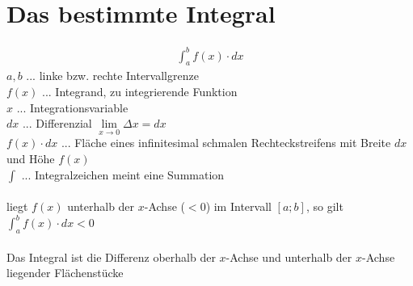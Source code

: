 \section{Das bestimmte Integral}
\begin{gather*}
  \int_a^b f(x) \cdot dx
\end{gather*}
$a, b$ ... linke bzw. rechte Intervallgrenze \\
$f(x)$ ... Integrand, zu integrierende Funktion \\
$x$ ... Integrationsvariable \\
$dx$ ... Differenzial \gap $\lim\limits_{x \to 0} \Delta x = dx$ \\
$f(x) \cdot dx$ ... Fläche eines infinitesimal schmalen Rechteckstreifens mit Breite $dx$ und Höhe $f(x)$ \\
$\int$ ... Integralzeichen meint eine Summation \\\\
liegt $f(x)$ unterhalb der $x$-Achse ($<0$) im Intervall $\left[a; b\right]$, so gilt $\int_a^b f(x) \cdot dx < 0$ \\\\
Das Integral ist die Differenz oberhalb der $x$-Achse und unterhalb der $x$-Achse liegender Flächenstücke
